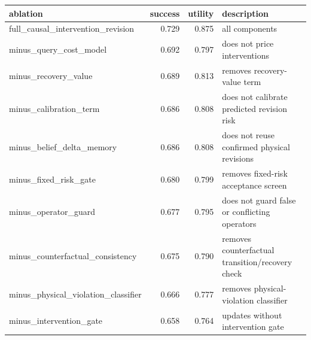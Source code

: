 \begin{tabular}{lrrl}
\toprule
ablation & success & utility & description \\
\midrule
full\_causal\_intervention\_revision & 0.729 & 0.875 & all components \\
minus\_query\_cost\_model & 0.692 & 0.797 & does not price interventions \\
minus\_recovery\_value & 0.689 & 0.813 & removes recovery-value term \\
minus\_calibration\_term & 0.686 & 0.808 & does not calibrate predicted revision risk \\
minus\_belief\_delta\_memory & 0.686 & 0.808 & does not reuse confirmed physical revisions \\
minus\_fixed\_risk\_gate & 0.680 & 0.799 & removes fixed-risk acceptance screen \\
minus\_operator\_guard & 0.677 & 0.795 & does not guard false or conflicting operators \\
minus\_counterfactual\_consistency & 0.675 & 0.790 & removes counterfactual transition/recovery check \\
minus\_physical\_violation\_classifier & 0.666 & 0.777 & removes physical-violation classifier \\
minus\_intervention\_gate & 0.658 & 0.764 & updates without intervention gate \\
\bottomrule
\end{tabular}
